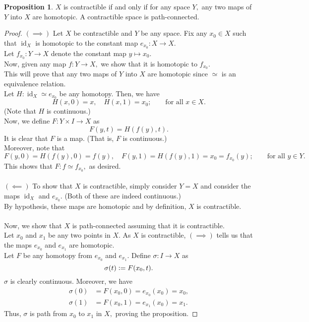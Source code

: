 \documentclass[12pt]{article}
\theoremstyle{definition}
\numberwithin{thm}{section}
\newtheorem{prop}[thm]{Proposition}
\newcommand{\id}{\operatorname{id}}
\begin{document}
\begin{prop} \label{prop:contracpath} %
	$X$ is contractible if and only if for any space $Y,$ any two maps of $Y$ into $X$ are homotopic. A contractible space is path-connected.
\end{prop}
\begin{proof} 
	$(\implies)$ Let $X$ be contractible and $Y$ be any space. Fix any $x_0 \in X$ such that $\id_X$ is homotopic to the constant map $e_{x_0}:X\to X.$ \\
	Let $f_{x_0}:Y\to X$ denote the constant map $y \mapsto x_0.$\\
	Now, given any map $f:Y\to X,$ we show that it is homotopic to $f_{x_0}.$ \\This will prove that any two maps of $Y$ into $X$ are homotopic since $\simeq$ is an equivalence relation.\\
	Let $H:\id_X \simeq e_{x_0}$ be any homotopy. Then, we have
	\begin{equation*} 
		H(x, 0) = x,\quad H(x, 1) = x_0; \qquad \text{for all } x \in X.
	\end{equation*}
	(Note that $H$ is continuous.)\\
	Now, we define $F:Y\times I \to X$ as
	\begin{equation*} 
		F(y, t) = H(f(y), t).
	\end{equation*}
	It is clear that $F$ is a map. (That is, $F$ is continuous.)\\
	Moreover, note that
	\begin{equation*} 
		F(y, 0) = H(f(y), 0) = f(y), \quad F(y, 1) = H(f(y), 1) = x_0 = f_{x_0}(y); \qquad \text{for all } y \in Y.
	\end{equation*}
	This shows that $F:f\simeq f_{x_0},$ as desired.\\~\\
	$(\impliedby)$ To show that $X$ is contractible, simply consider $Y = X$ and consider the maps $\id_X$ and $e_{x_0}.$ (Both of these are indeed continuous.)\\
	By hypothesis, these maps are homotopic and by definition, $X$ is contractible.\\~\\
	Now, we show that $X$ is path-connected assuming that it is contractible.\\
	Let $x_0$ and $x_1$ be any two points in $X.$ As $X$ is contractible, $(\implies)$ tells us that the maps $e_{x_0}$ and $e_{x_1}$ are homotopic. \\
	Let $F$ be any homotopy from $e_{x_0}$ and $e_{x_1}.$ Define $\sigma:I\to X$ as 
	\begin{equation*} 
		\sigma(t) \vcentcolon= F(x_0, t).
	\end{equation*}
	$\sigma$ is clearly continuous. Moreover, we have
	\begin{align*} 
		\sigma(0) &= F(x_0, 0) = e_{x_0}(x_0) = x_0,\\
		\sigma(1) &= F(x_0, 1) = e_{x_1}(x_0) = x_1.
	\end{align*}
	Thus, $\sigma$ is path from $x_0$ to $x_1$ in $X,$ proving the proposition.
\end{proof}
\end{document}
